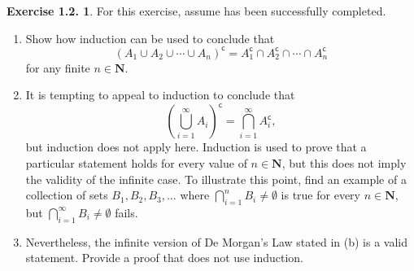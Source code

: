 \documentclass[12pt]{article}
\theoremstyle{definition}
\theoremstyle{exercise}
\newtheorem{exercise}{Exercise 1.2.}
\theoremstyle{solution}
\newcommand{\setcomp}[1]{#1^{\mathsf{c}}}
\begin{document}
\begin{exercise}
\label{ex:13}
    For this exercise, assume  has been successfully completed.
    \begin{enumerate}[label = (\alph*)]
        \item Show how induction can be used to conclude that
        \[
            \setcomp{(A_1 \cup A_2 \cup \cdots \cup A_n)} = \setcomp{A_1} \cap \setcomp{A_2} \cap \cdots \cap \setcomp{A_n}
        \]
        for any finite \( n \in \mathbf{N} \).

        \item It is tempting to appeal to induction to conclude that
        \[
            \setcomp{\left( \bigcup_{i=1}^{\infty} A_i \right)} = \bigcap_{i=1}^{\infty} \setcomp{A_i},
        \]
        but induction does not apply here. Induction is used to prove that a particular statement holds for every value of \( n \in \mathbf{N} \), but this does not imply the validity of the infinite case. To illustrate this point, find an example of a collection of sets \( B_1, B_2, B_3, \ldots \) where \( \bigcap_{i=1}^n B_i \neq \emptyset \) is true for every \( n \in \mathbf{N} \), but \( \bigcap_{i=1}^{\infty} B_i \neq \emptyset \) fails.

        \item Nevertheless, the infinite version of De Morgan's Law stated in (b) is a valid statement. Provide a proof that does not use induction.
    \end{enumerate}
\end{exercise}
\end{document}
